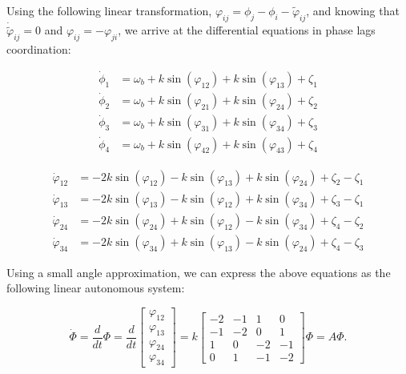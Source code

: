 \documentclass{article}
\begin{document}
Using the following linear transformation, $\varphi_{ij} = \phi_j - \phi_i - \tilde{\varphi}_{ij}$, and knowing that $\dot{\tilde{\varphi}}_{ij} = 0$ and $\varphi_{ij} = - \varphi_{ji}$, we arrive at the differential equations in phase lags coordination: 

\begin{align}\label{eq:cpg_net2}
	\dot\phi_1&=\omega_{b} + k\sin \left(\varphi_{12}\right)+k\sin\left(\varphi_{13}\right)+ \zeta_1\\
 	\dot\phi_2&=\omega_{b} + k\sin \left(\varphi_{21}\right)+k\sin\left(\varphi_{24}\right)+ \zeta_2\\
 	\dot\phi_3&=\omega_{b} + k\sin \left(\varphi_{31}\right)+k\sin\left(\varphi_{34}\right)+ \zeta_3\\
	\dot\phi_4&=\omega_{b} + k\sin \left(\varphi_{42}\right)+k\sin\left(\varphi_{43}\right)+ \zeta_4
\end{align}

\begin{align}
	\dot\varphi_{12}&= -2k\sin \left(\varphi_{12}\right)-k\sin\left(\varphi_{13}\right)+ k\sin\left(\varphi_{24}\right) + \zeta_2-\zeta_1 \label{eq:cpg_net3_1}\\
	\dot\varphi_{13}&= -2k\sin \left(\varphi_{13}\right)-k\sin\left(\varphi_{12}\right)+ k\sin\left(\varphi_{34}\right) + \zeta_3-\zeta_1\\
	\dot\varphi_{24}&= -2k\sin \left(\varphi_{24}\right)+k\sin\left(\varphi_{12}\right)- k\sin\left(\varphi_{34}\right) + \zeta_4-\zeta_2\\
	\dot\varphi_{34}&= -2k\sin \left(\varphi_{34}\right)+k\sin\left(\varphi_{13}\right)- k\sin\left(\varphi_{24}\right) + \zeta_4-\zeta_3 \label{eq:cpg_net3_4}
\end{align}

Using a small angle approximation, we can express the above equations as the following linear autonomous system:

\begin{equation}
  	\dot{\Phi} = \frac{d}{dt} \Phi =\frac{d}{dt}
  	\left[\begin{array}{c}\varphi_{12} \\ \varphi_{13} \\ \varphi_{24} \\ \varphi_{34}\end{array}\right]
  	=k\left[ \begin{array}{rrrr}
	-2 & -1 &  1 &  0   \\
	-1 & -2 &  0 &  1  \\
	 1 &  0 & -2 & -1   \\
	 0 &  1 & -1 & -2 
	\end{array} \right] \Phi = \hat{A}\Phi.
\end{equation}
	
\end{document}

